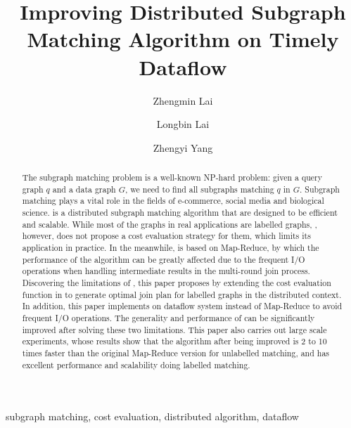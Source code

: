 \documentclass[conference]{IEEEtran}
\begin{document}
\title{Improving Distributed Subgraph Matching Algorithm on Timely Dataflow}

\author[1]{Zhengmin Lai}
\author[2]{Longbin Lai}
\author[2]{Zhengyi Yang}

\maketitle

\begin{abstract}
The subgraph matching problem is a well-known NP-hard problem: given a query graph $q$ and a data graph $G$, we need to find all subgraphs matching $q$ in $G$. Subgraph matching plays a vital role in the fields of e-commerce, social media and biological science. \cliquejoin is a distributed subgraph matching algorithm that are designed to be efficient and scalable. While most of the graphs in real applications are labelled graphs, \cliquejoin, however, does not propose a cost evaluation strategy for them, which limits its application in practice. In the meanwhile, \cliquejoin is based on Map-Reduce, by which the performance of the algorithm can be greatly affected due to the frequent I/O operations when handling intermediate results in the multi-round join process. Discovering the limitations of \cliquejoin, this paper proposes \gencliqjoin by extending the cost evaluation function in \cliquejoin to generate optimal join plan for labelled graphs in the distributed context. In addition, this paper implements \gencliqjoin on \timely dataflow system instead of Map-Reduce to avoid frequent I/O operations. The generality and performance of \cliquejoin can be significantly improved after solving these two limitations. This paper also carries out large scale experiments, whose results show that the algorithm after being improved is 2 to 10 times faster than the original Map-Reduce version for unlabelled matching, and has excellent performance and scalability doing labelled matching.
\end{abstract}

\begin{IEEEkeywords}
 subgraph matching, cost evaluation, distributed algorithm, dataflow
\end{IEEEkeywords}















\end{document}
